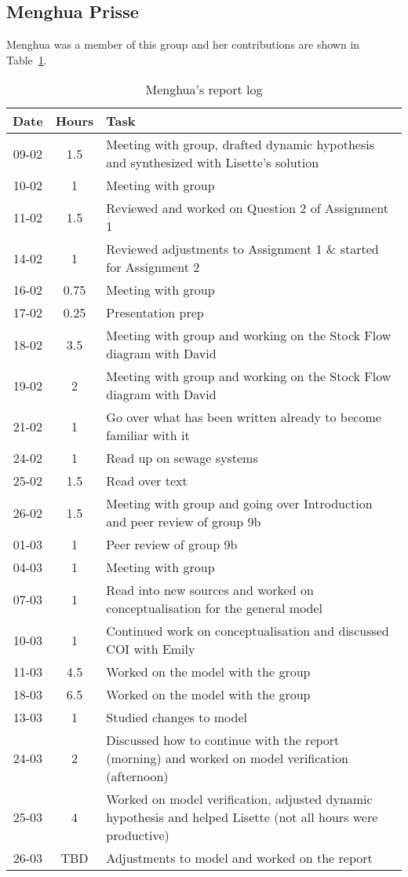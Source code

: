 
\subsection{Menghua Prisse}
Menghua was a member of this group and her contributions are shown in Table~\ref{tab:menghua_log}. 
\begin{longtable}[c]{c|c|m{35em}}
\caption{Menghua's report log}
\label{tab:menghua_log}\\
\textbf{Date}& \textbf{Hours} & \textbf{Task} \\
\hline
\endfirsthead
%
\endhead
%
09-02  & 1.5 & Meeting with group, drafted dynamic hypothesis and synthesized with Lisette's solution\\
10-02 & 1 & Meeting with group \\ 
11-02 & 1.5 & Reviewed and worked on Question 2 of Assignment 1 \\
14-02 & 1 & Reviewed adjustments to Assignment 1 \& started for Assignment 2 \\ 
16-02 & 0.75 & Meeting with group \\ 
17-02 & 0.25 & Presentation prep \\
18-02 & 3.5 & Meeting with group and working on the Stock Flow diagram with David  \\
19-02 & 2 & Meeting with group and working on the Stock Flow diagram with David \\ 
21-02 & 1 & Go over what has been written already to become familiar with it \\
24-02 & 1 & Read up on sewage systems \\ 
25-02 & 1.5 & Read over text \\ 
26-02 & 1.5 & Meeting with group and going over Introduction and peer review of group 9b \\ 
01-03 & 1 & Peer review of group 9b \\
04-03 & 1 & Meeting with group \\
07-03 & 1 & Read into new sources and worked on conceptualisation for the general model \\ 
10-03 & 1 & Continued work on conceptualisation and discussed COI with Emily \\ 
11-03 & 4.5 & Worked on the model with the group \\
18-03 & 6.5 & Worked on the model with the group \\
13-03 & 1 & Studied changes to model \\ 
24-03 & 2 & Discussed how to continue with the report (morning) and worked on model verification (afternoon) \\ 
25-03 & 4 & Worked on model verification, adjusted dynamic hypothesis and helped Lisette (not all hours were productive) \\ 
26-03 & TBD & Adjustments to model and worked on the report \\ 




\end{longtable}

